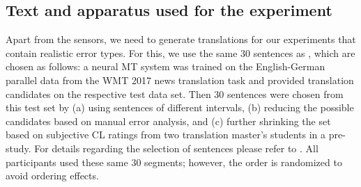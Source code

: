 \documentclass[output=paper]{langsci/langscibook}
\begin{document}
\subsection{Text and apparatus used for the experiment}
Apart from the sensors, we need to generate translations for our experiments that contain realistic error types. For this, we use the same 30 sentences as \citet{herbig2019mt}, which are chosen as follows: %
a neural MT system \citep{Gehring:2017:fair} was trained on the English-German parallel data from the WMT 2017 news translation task and provided translation candidates on the respective test data set. %
Then 30 sentences were chosen from this test set by (a) using sentences of different \ter{} intervals, (b) reducing the possible candidates based on manual error analysis, and (c) further shrinking the set based on subjective CL ratings from two translation master's students in a pre-study. For details regarding the selection of sentences please refer to \cite{herbig2019mt}.
All participants used these same 30 segments; however, the order is randomized to avoid ordering effects. %
\end{document}
